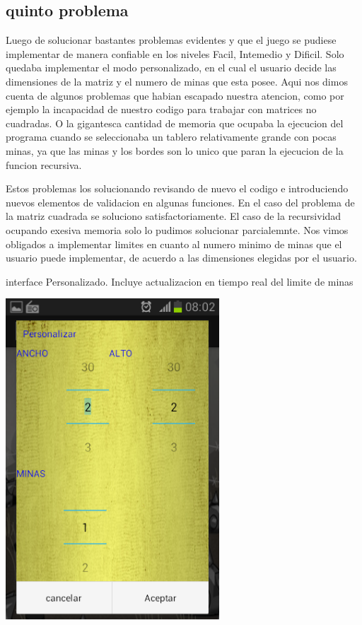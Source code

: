 \documentclass[11pt]{article} %
\begin{document}
\subsection{quinto problema }

Luego de solucionar bastantes problemas evidentes y que el juego se pudiese implementar de manera confiable en los niveles Facil, Intemedio y Dificil. Solo quedaba implementar el modo personalizado, en el cual el usuario decide las dimensiones de la matriz y el numero de minas que esta posee. Aqui nos dimos cuenta de algunos problemas que habian escapado nuestra atencion, como por ejemplo la incapacidad de nuestro codigo para trabajar con matrices no cuadradas. O la gigantesca cantidad de memoria que ocupaba la ejecucion del programa cuando se seleccionaba un tablero relativamente grande con pocas minas, ya que las minas y los bordes son lo unico que paran la ejecucion de la funcion recursiva. 

Estos problemas los solucionando revisando de nuevo el codigo e introduciendo nuevos elementos de validacion en algunas funciones. 
En el caso del problema de la matriz cuadrada se soluciono satisfactoriamente.
El caso de la recursividad ocupando exesiva memoria solo lo pudimos solucionar parcialemnte. 
Nos vimos obligados a implementar limites en cuanto al numero minimo de minas que el usuario puede implementar, de acuerdo a las dimensiones elegidas por el usuario.

\begin{center}
interface Personalizado. Incluye actualizacion en tiempo real del limite de minas 

\includegraphics[width=8cm]{imagenes/Screenshot_2013-12-11-08-02-34.png}
\end{center}
\end{document}
